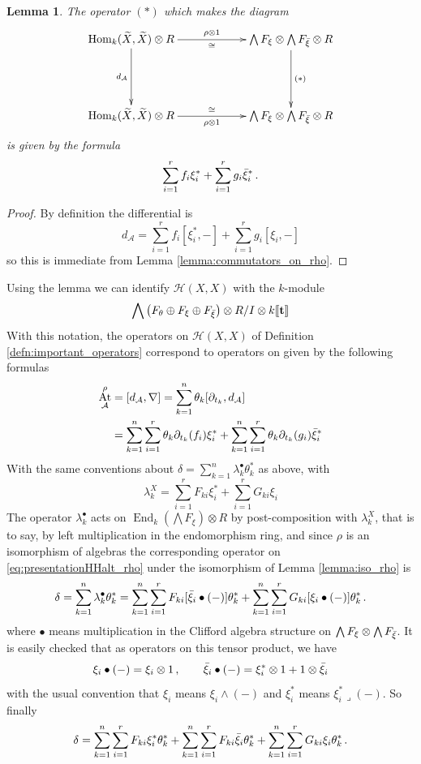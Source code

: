 \documentclass[english,letter paper,12pt,leqno]{article}
\newtheorem{lemma}[theorem]{Lemma}
\theoremstyle{example}
\numberwithin{equation}{section}
\def\AA{\mathcal{A}}
\def\HH{\HH}
\def\HH{\mathcal{H}}
\def\Hom{\operatorname{Hom}}
\def\be{\begin{equation}}
\def\ee{\end{equation}}
\DeclareMathOperator{\End}{End}
\DeclareMathOperator{\vAt}{At}
\begin{document}
\begin{lemma}\label{lemma:transfer_rho} The operator $(*)$ which makes the diagram
\[
\xymatrix@C+3pc@R+2pc{
\Hom_k( \widetilde{X}, \widetilde{X} ) \otimes R \ar[d]_-{d_{\AA}} \ar[r]_-{\cong}^-{ \rho \otimes 1} & \bigwedge F_\xi \otimes \bigwedge F_{\Bar{\xi}} \otimes R \ar[d]^-{(*)}\\
\Hom_k( \widetilde{X}, \widetilde{X} ) \otimes R \ar[r]^-{\cong}_-{ \rho \otimes 1 } & \bigwedge F_\xi \otimes \bigwedge F_{\Bar{\xi}} \otimes R
}
\]
is given by the formula
\[
\sum_{i=1}^r f_i \xi_i^* + \sum_{i=1}^r g_i \Bar{\xi}_i^*\,.
\]
\end{lemma}
\begin{proof}
By definition the differential is
\[
d_{\AA} = \sum_{i=1}^r f_i [ \xi_i^*, - ] + \sum_{i=1}^r g_i [ \xi_i, - ]
\]
so this is immediate from Lemma \ref{lemma:commutators_on_rho}.
\end{proof}

Using the lemma we can identify $\HH(X,X)$ with the $k$-module
\be\label{eq:presentationHHalt_rho}
\bigwedge \big( F_\theta \oplus F_\xi \oplus F_{\Bar{\xi}} \big) \otimes R/I \otimes k\llbracket \bold{t} \rrbracket
\ee
With this notation, the operators on $\HH(X,X)$ of Definition \ref{defn:important_operators} correspond to operators on given by the following formulas
\begin{align*}
\vAt^\rho_{\AA} &= [ d_{\AA}, \nabla ] = \sum_{k=1}^n \theta_k [ \partial_{t_k}, d_{\AA} ]\\
&= \sum_{k=1}^n \sum_{i=1}^r \theta_k \partial_{t_k}(f_i) \xi_i^* + \sum_{k=1}^n \sum_{i=1}^r \theta_k \partial_{t_k}(g_i) \Bar{\xi}_i^*
\end{align*}
With the same conventions about $\delta = \sum_{k=1}^n \lambda^\bullet_k \theta_k^*$ as above, with
\be
\lambda^X_k = \sum_{i=1}^r F_{ki} \xi_i^* + \sum_{i=1}^r G_{ki} \xi_i
\ee
The operator $\lambda_k^\bullet$ acts on $\End_k( \bigwedge F_\xi ) \otimes R$ by post-composition with $\lambda^X_k$, that is to say, by left multiplication in the endomorphism ring, and since $\rho$ is an isomorphism of algebras the corresponding operator on \eqref{eq:presentationHHalt_rho} under the isomorphism of Lemma \ref{lemma:iso_rho} is
\be
\delta = \sum_{k=1}^n \lambda^\bullet_k \theta_k^* = \sum_{k=1}^n \sum_{i=1}^r F_{ki} [\Bar{\xi}_i \bullet (-)] \theta_k^* + \sum_{k=1}^n \sum_{i=1}^r G_{ki} [\xi_i \bullet (-)] \theta_k^*\,.
\ee
where $\bullet$ means multiplication in the Clifford algebra structure on $\bigwedge F_\xi \otimes \bigwedge F_{\Bar{\xi}}$. It is easily checked that as operators on this tensor product, we have
\[
\xi_i \bullet (-) = \xi_i \otimes 1\,, \qquad \Bar{\xi}_i \bullet (-) = \xi_i^* \otimes 1 + 1 \otimes \Bar{\xi}_i
\]
with the usual convention that $\xi_i$ means $\xi_i \wedge (-)$ and $\xi_i^*$ means $\xi_i^* \lrcorner (-)$. So finally
\be
\delta = \sum_{k=1}^n \sum_{i=1}^r F_{ki} \xi_i^* \theta_k^* + \sum_{k=1}^n \sum_{i=1}^r F_{ki} \Bar{\xi}_i \theta_k^* + \sum_{k=1}^n \sum_{i=1}^r G_{ki} \xi_i \theta_k^*\,.
\ee
\end{document}
